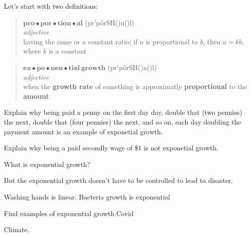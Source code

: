 \documentclass[nooutcomes,noauthor,hints]{ximera}
\begin{document}
\mynewpage



\begin{question}
  Let's start with two definitions:
  \begin{mdframed}[style=OutcomeStyle]
\begin{quote}
  $\textbf{pro}\bullet\textbf{por}\bullet\textbf{tion}\bullet\textbf{al}$
  (pr{}$'$p\^orSH({})n({})l)
  \\
  
  \textit{adjective}\\

  
\quad having the same or a constant ratio; if $a$ is proportional to
$b$, then $a = k b$, where $k$ is a constant
\end{quote}
  \end{mdframed}

  
  \begin{mdframed}[style=OutcomeStyle]
\begin{quote}
  $\textbf{ex}\bullet\textbf{po}\bullet\textbf{nen}\bullet\textbf{tial}~\textbf{growth}$
  (pr{}$'$p\^orSH({})n({})l)
  \\
  
  \textit{adjective}\\

  
\quad when the \textbf{growth rate} of something is approximatly
\textbf{proportional} to the \textbf{amount}
\end{quote}
  \end{mdframed}
  \item Explain why being paid a penny on the first day day, double
    that (two pennies) the next, double that (four pennies) the next,
    and so on, each day doubling the payment amount is an example of
    exponetial growth.

  \item Explain why being a paid secondly wage of $\$1$ is not
    exponetial growth.


  What is exponential growth?

But the exponential growth doesn't have to be controlled to lead to disaster.


Washing hands is linear. Bacteria growth is exponential


\end{question}
\mynewpage


\begin{question}
  Find examples of exponential growth.Covid


Climate.


\end{question}
\end{document}
